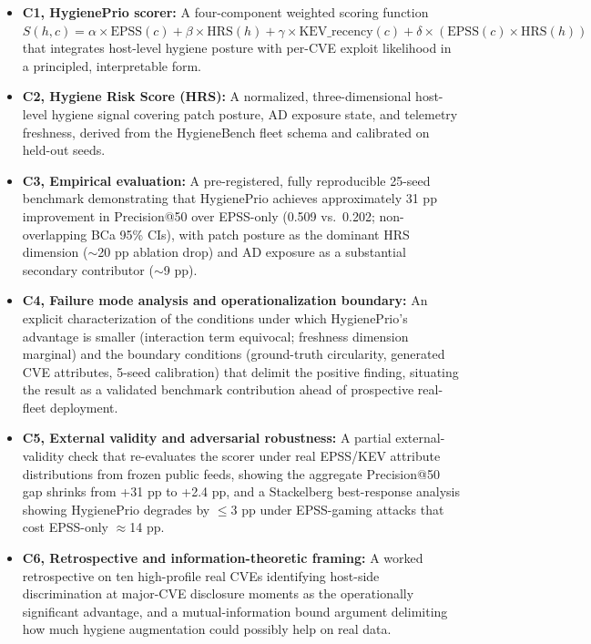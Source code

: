 \begin{itemize}
 \item \textbf{C1, HygienePrio scorer:} A four-component weighted scoring function $S(h, c) = \alpha \times \mathrm{EPSS}(c) + \beta \times \mathrm{HRS}(h) + \gamma \times \mathrm{KEV\_recency}(c) + \delta \times (\mathrm{EPSS}(c) \times \mathrm{HRS}(h))$ that integrates host-level hygiene posture with per-CVE exploit likelihood in a principled, interpretable form.

 \item \textbf{C2, Hygiene Risk Score (HRS):} A normalized, three-dimensional host-level hygiene signal covering patch posture, AD exposure state, and telemetry freshness, derived from the HygieneBench fleet schema and calibrated on held-out seeds.

 \item \textbf{C3, Empirical evaluation:} A pre-registered, fully reproducible 25-seed benchmark demonstrating that HygienePrio achieves approximately 31 pp improvement in Precision@50 over EPSS-only (0.509 vs.\ 0.202; non-overlapping BCa 95\% CIs), with patch posture as the dominant HRS dimension ($\sim$20 pp ablation drop) and AD exposure as a substantial secondary contributor ($\sim$9 pp).

 \item \textbf{C4, Failure mode analysis and operationalization boundary:} An explicit characterization of the conditions under which HygienePrio's advantage is smaller (interaction term equivocal; freshness dimension marginal) and the boundary conditions (ground-truth circularity, generated CVE attributes, 5-seed calibration) that delimit the positive finding, situating the result as a validated benchmark contribution ahead of prospective real-fleet deployment.

 \item \textbf{C5, External validity and adversarial robustness:} A partial external-validity check that re-evaluates the scorer under real EPSS/KEV attribute distributions from frozen public feeds, showing the aggregate Precision@50 gap shrinks from +31 pp to +2.4 pp, and a Stackelberg best-response analysis showing HygienePrio degrades by $\leq 3$ pp under EPSS-gaming attacks that cost EPSS-only $\approx$14 pp.

 \item \textbf{C6, Retrospective and information-theoretic framing:} A worked retrospective on ten high-profile real CVEs identifying host-side discrimination at major-CVE disclosure moments as the operationally significant advantage, and a mutual-information bound argument delimiting how much hygiene augmentation could possibly help on real data.
\end{itemize}

